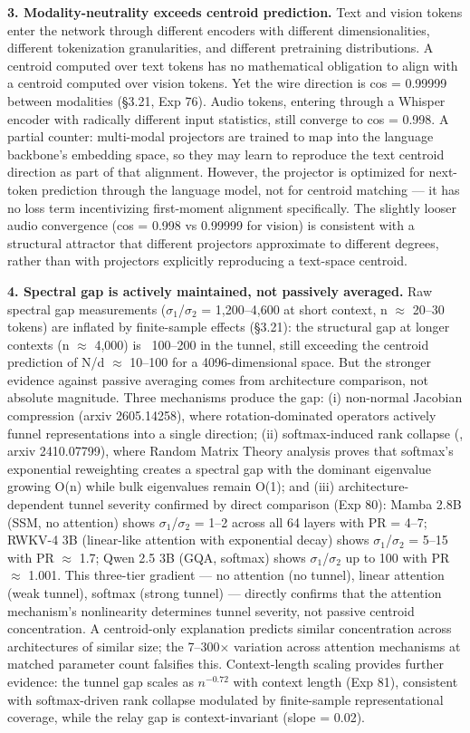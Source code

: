 \documentclass[11pt]{article}
\begin{document}
\textbf{3. Modality-neutrality exceeds centroid prediction.} Text and vision tokens enter the network through different encoders with different dimensionalities, different tokenization granularities, and different pretraining distributions. A centroid computed over text tokens has no mathematical obligation to align with a centroid computed over vision tokens. Yet the wire direction is cos = 0.99999 between modalities (§3.21, Exp 76). Audio tokens, entering through a Whisper encoder with radically different input statistics, still converge to cos = 0.998. A partial counter: multi-modal projectors are trained to map into the language backbone's embedding space, so they may learn to reproduce the text centroid direction as part of that alignment. However, the projector is optimized for next-token prediction through the language model, not for centroid matching --- it has no loss term incentivizing first-moment alignment specifically. The slightly looser audio convergence (cos = 0.998 vs 0.99999 for vision) is consistent with a structural attractor that different projectors approximate to different degrees, rather than with projectors explicitly reproducing a text-space centroid.

\textbf{4. Spectral gap is actively maintained, not passively averaged.} Raw spectral gap measurements ($\sigma$$_1$/$\sigma$$_2$ = 1,200–4,600 at short context, n $\approx$ 20–30 tokens) are inflated by finite-sample effects (§3.21): the structural gap at longer contexts (n $\approx$ 4,000) is ~100–200 in the tunnel, still exceeding the centroid prediction of N/d $\approx$ 10–100 for a 4096-dimensional space. But the stronger evidence against passive averaging comes from architecture comparison, not absolute magnitude. Three mechanisms produce the gap: (i) non-normal Jacobian compression (arxiv 2605.14258), where rotation-dominated operators actively funnel representations into a single direction; (ii) softmax-induced rank collapse (\citet{naitsaada2024spectral}, arxiv 2410.07799), where Random Matrix Theory analysis proves that softmax's exponential reweighting creates a spectral gap with the dominant eigenvalue growing O(n) while bulk eigenvalues remain O(1); and (iii) architecture-dependent tunnel severity confirmed by direct comparison (Exp 80): Mamba 2.8B (SSM, no attention) shows $\sigma$$_1$/$\sigma$$_2$ = 1–2 across all 64 layers with PR = 4–7; RWKV-4 3B (linear-like attention with exponential decay) shows $\sigma$$_1$/$\sigma$$_2$ = 5–15 with PR $\approx$ 1.7; Qwen 2.5 3B (GQA, softmax) shows $\sigma$$_1$/$\sigma$$_2$ up to 100 with PR $\approx$ 1.001. This three-tier gradient --- no attention (no tunnel), linear attention (weak tunnel), softmax (strong tunnel) --- directly confirms that the attention mechanism's nonlinearity determines tunnel severity, not passive centroid concentration. A centroid-only explanation predicts similar concentration across architectures of similar size; the 7–300$\times$ variation across attention mechanisms at matched parameter count falsifies this. Context-length scaling provides further evidence: the tunnel gap scales as $n^{-0.72}$ with context length (Exp 81), consistent with softmax-driven rank collapse modulated by finite-sample representational coverage, while the relay gap is context-invariant (slope = 0.02).
\end{document}
